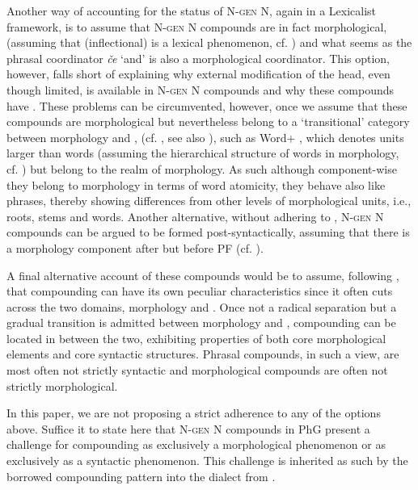 \documentclass[output=paper]{LSP/langsci}
\begin{document}
Another way of accounting for the status of N-\textsc{gen} N, again in a Lexicalist framework, is to assume that N-\textsc{gen} N compounds are in fact morphological, (assuming that (inflectional)  is a lexical phenomenon, cf. \citealt{Chomsky1995}) and what seems as the phrasal coordinator \textit{če} `and' is also a morphological coordinator. This option, however, falls short of explaining why external modification of the head, even though limited, is available in N-\textsc{gen} N compounds and why these compounds have . These problems can be circumvented, however, once we assume that these compounds are morphological but nevertheless belong to a `transitional' category between morphology and , (cf. \citealt{Kageyama2001}, see also \citealt{Borer1998}), such as Word$+$ \citep{Kageyama2001}, which denotes units larger than words (assuming the hierarchical structure of words in morphology, cf. \citealt{HalleVaux1998}) but belong to the realm of morphology. As such although component-wise they belong to morphology in terms of word atomicity, they behave also like phrases, thereby showing differences from other levels of morphological units, i.e., roots, stems and words. Another  alternative, without adhering to , N-\textsc{gen} N compounds can be argued to be formed post-syntactically, assuming that there is a morphology component after  but before PF (cf. \cite{HalleMarantz1993}).

A final alternative account of these compounds would be to assume, following \citet{Ralli2013locus}, that compounding can have its own peculiar characteristics since it often cuts across the two domains, morphology and . Once not a radical separation but a gradual transition is admitted between morphology and , compounding can be located in between the two, exhibiting properties of both core morphological elements and  core syntactic structures. Phrasal compounds, in such a view, are most often not strictly syntactic and morphological compounds are often not strictly morphological.

	In this paper, we are not proposing a strict adherence to any of the options above. Suffice it to state here that N-\textsc{gen} N compounds in PhG present a challenge for compounding as exclusively a morphological phenomenon or as exclusively as a syntactic phenomenon. This challenge is inherited as such by the borrowed compounding pattern into the dialect from .  
\end{document}
